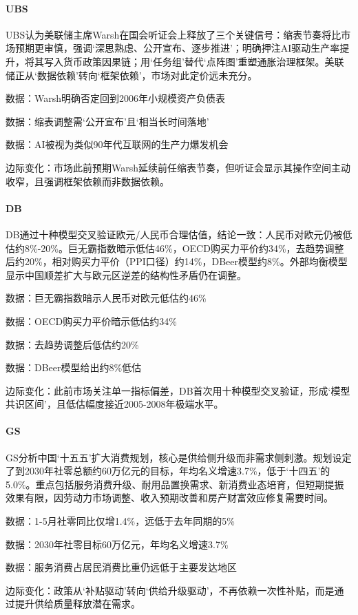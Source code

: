 \documentclass[11pt]{ctexart}
\begin{document}
\paragraph{UBS} UBS认为美联储主席Warsh在国会听证会上释放了三个关键信号：缩表节奏将比市场预期更审慎，强调‘深思熟虑、公开宣布、逐步推进’；明确押注AI驱动生产率提升，将其写入货币政策因果链；用‘任务组’替代‘点阵图’重塑通胀治理框架。美联储正从‘数据依赖’转向‘框架依赖’，市场对此定价远未充分。
{\small\color{refgray}数据：Warsh明确否定回到2006年小规模资产负债表\par}
{\small\color{refgray}数据：缩表调整需‘公开宣布’且‘相当长时间落地’\par}
{\small\color{refgray}数据：AI被视为类似90年代互联网的生产力爆发机会\par}
{\small\color{refgray}边际变化：市场此前预期Warsh延续前任缩表节奏，但听证会显示其操作空间主动收窄，且强调框架依赖而非数据依赖。\par}
\paragraph{DB} DB通过十种模型交叉验证欧元/人民币合理估值，结论一致：人民币对欧元仍被低估约8\%-20\%。巨无霸指数暗示低估46\%，OECD购买力平价约34\%，去趋势调整后约20\%，相对购买力平价（PPI口径）约14\%，DBeer模型约8\%。外部均衡模型显示中国顺差扩大与欧元区逆差的结构性矛盾仍在调整。
{\small\color{refgray}数据：巨无霸指数暗示人民币对欧元低估约46\%\par}
{\small\color{refgray}数据：OECD购买力平价暗示低估约34\%\par}
{\small\color{refgray}数据：去趋势调整后低估约20\%\par}
{\small\color{refgray}数据：DBeer模型给出约8\%低估\par}
{\small\color{refgray}边际变化：此前市场关注单一指标偏差，DB首次用十种模型交叉验证，形成‘模型共识区间’，且低估幅度接近2005-2008年极端水平。\par}
\paragraph{GS} GS分析中国‘十五五’扩大消费规划，核心是供给侧升级而非需求侧刺激。规划设定了到2030年社零总额约60万亿元的目标，年均名义增速3.7\%，低于‘十四五’的5.0\%。重点包括服务消费升级、耐用品置换需求、新消费业态培育，但短期提振效果有限，因劳动力市场调整、收入预期改善和房产财富效应修复需要时间。
{\small\color{refgray}数据：1-5月社零同比仅增1.4\%，远低于去年同期的5\%\par}
{\small\color{refgray}数据：2030年社零目标60万亿元，年均名义增速3.7\%\par}
{\small\color{refgray}数据：服务消费占居民消费比重仍远低于主要发达地区\par}
{\small\color{refgray}边际变化：政策从‘补贴驱动’转向‘供给升级驱动’，不再依赖一次性补贴，而是通过提升供给质量释放潜在需求。\par}
\end{document}
